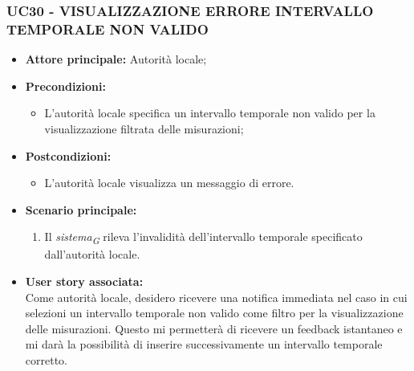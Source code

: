 \subsubsection{UC30 - VISUALIZZAZIONE ERRORE INTERVALLO TEMPORALE NON VALIDO}
\begin{itemize}
      \item \textbf{Attore principale:} Autorità locale;
      \item \textbf{Precondizioni:}
            \begin{itemize} 
                  \item L'autorità locale specifica un intervallo temporale non valido per la visualizzazione filtrata delle misurazioni;
            \end{itemize}
            \item \textbf{Postcondizioni:}
            \begin{itemize}
                  \item L'autorità locale visualizza un messaggio di errore.
            \end{itemize}
            \item \textbf{Scenario principale:}
            \begin{enumerate}
                  \item Il \textit{sistema}\textsubscript{\textit{G}} rileva l'invalidità dell'intervallo temporale specificato dall'autorità locale.
                  \end{enumerate}
      \item \textbf{User story associata:} \\
            Come autorità locale, desidero ricevere una notifica immediata nel caso in cui selezioni un intervallo temporale non valido come filtro per la visualizzazione delle misurazioni. Questo mi permetterà di ricevere un feedback istantaneo e mi darà la possibilità di inserire successivamente un intervallo temporale corretto.
\end{itemize}